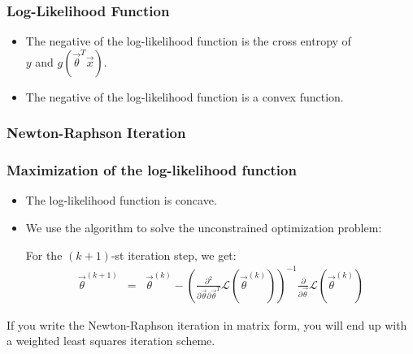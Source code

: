 \begin{frame}
  \frametitle{Log-Likelihood Function \cont}


  \begin{itemize}
    \item The negative of the log-likelihood function is the cross entropy of\\
      $y$ and $g(\vec \theta^T\vec x)$. \\[.5cm]
    \item The negative of the log-likelihood function is a convex function.
  \end{itemize}
\end{frame}




\subsubsection{Newton-Raphson Iteration}

\begin{frame}
  \frametitle{Maximization of the log-likelihood function}

  \begin{itemize}
    \item The log-likelihood function is concave. 
    \item We use the \point\href{http://www.stat.washington.edu/quinn/classes/560/Newton.pdf}{} algorithm to solve the unconstrained optimization problem:
      \spread

      For the $(k+1)$-st iteration step, we get:
%
      \begin{eqnarray*}
        \vec \theta^{(k+1)} &=& \vec \theta^{(k)} - \left(  \frac{\partial^2}{\partial\vec \theta \partial \vec \theta^T} \mathcal{L} \left(\vec \theta^{(k)} \right)  \right)^{-1}   
       \frac{\partial}{\partial\vec \theta} \mathcal{L}\left(\vec \theta^{(k)}\right)
      \end{eqnarray*}
  \end{itemize}
  \spread
 
   If you write the Newton-Raphson iteration in matrix form, you will end up with a weighted least squares iteration scheme.
\end{frame}


